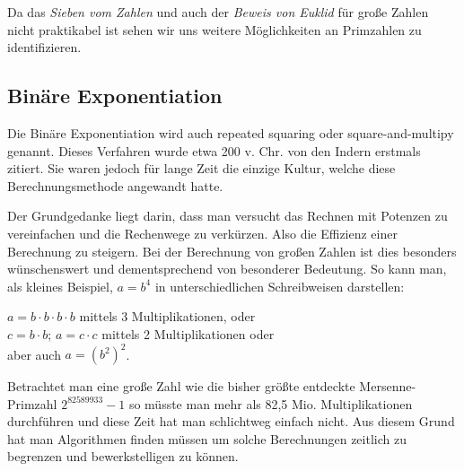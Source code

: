 \documentclass[12pt,a4paper]{article}
\theoremstyle{definition}
\begin{document}
Da das \textit{Sieben vom Zahlen} und auch der \textit{Beweis von Euklid} für große Zahlen nicht praktikabel ist sehen wir uns weitere Möglichkeiten an Primzahlen zu identifizieren.

\subsection{Binäre Exponentiation}
Die Binäre Exponentiation wird auch repeated squaring oder square-and-multipy genannt.
Dieses Verfahren wurde etwa 200 v. Chr. von den Indern erstmals zitiert.
Sie waren jedoch für lange Zeit die einzige Kultur, welche diese Berechnungsmethode angewandt hatte.

Der Grundgedanke liegt darin, dass man versucht das Rechnen mit Potenzen zu vereinfachen und die Rechenwege zu verkürzen.
Also die Effizienz einer Berechnung zu steigern.
Bei der Berechnung von großen Zahlen ist dies besonders wünschenswert und dementsprechend von besonderer Bedeutung.
So kann man, als kleines Beispiel, $a = b^4$ in unterschiedlichen Schreibweisen darstellen:
\begin{center}
$a = b \cdot b \cdot b \cdot b$ mittels 3 Multiplikationen, oder \\
$c = b \cdot b$; $a = c \cdot c$ mittels 2 Multiplikationen oder \\
aber auch $a = (b^2)^2$.
\end{center}

Betrachtet man eine große Zahl wie die bisher größte entdeckte Mersenne-Primzahl $2^{82589933} - 1$ so müsste man mehr als 82,5 Mio. Multiplikationen durchführen und diese Zeit hat man schlichtweg einfach nicht.
Aus diesem Grund hat man Algorithmen finden müssen um solche Berechnungen zeitlich zu begrenzen und bewerkstelligen zu können.
\end{document}
